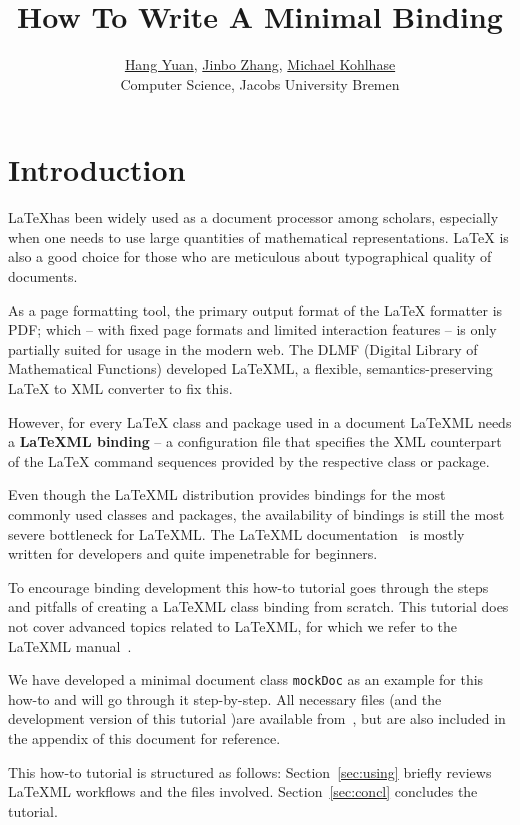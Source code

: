 \documentclass[a4paper]{article}
\title{\textbf{How To Write A Minimal \latexml Binding}}
\author{\href{mailto:h.yuan@jacobs-university.de}{Hang Yuan}, 
	\href{mailto:jin.zhang@jacobs-university.de}{Jinbo Zhang},
        \href{mailto:m.kohlhase@jacobs-university.de}{Michael Kohlhase}\\
        Computer Science, Jacobs University Bremen}
\def\latexml{{\LaTeX}ML\xspace}
\begin{document}
\maketitle

\section{Introduction}\label{sec:intro}

{\LaTeX}has been widely used as a document processor among scholars, especially when one
needs to use large quantities of mathematical representations. {\LaTeX} is also a good
choice for those who are meticulous about typographical quality of documents.

As a page formatting tool, the primary output format of the {\LaTeX} formatter is PDF;
which -- with fixed page formats and limited interaction features -- is only partially
suited for usage in the modern web. The DLMF (Digital Library of Mathematical Functions)
developed \latexml, a flexible, semantics-preserving {\LaTeX} to XML converter to fix
this.

However, for every {\LaTeX} class and package used in a document \latexml needs a
\textbf{\latexml binding} -- a configuration file that specifies the XML counterpart of
the {\LaTeX} command sequences provided by the respective class or package. 

Even though the \latexml distribution provides bindings for the most commonly used classes
and packages, the availability of bindings is still the most severe bottleneck for
\latexml. The \latexml documentation~\cite{LaTeXML:manual} is mostly written for developers and
quite impenetrable for beginners.

To encourage binding development this how-to tutorial goes through the steps and pitfalls
of creating a \latexml class binding from scratch. This tutorial does not cover advanced
topics related to \latexml, for which we refer to the \latexml manual~\cite{LaTeXML:manual}.

We have developed a minimal document class \lstinline|mockDoc| as an example for this
how-to and will go through it step-by-step. All necessary files (and the development
version of this tutorial )are available from~\cite{mockDoc:git}, but are also included in
the appendix of this document for reference.

This how-to tutorial is structured as follows: Section~\ref{sec:using} briefly reviews
\latexml workflows and the files involved. Section~\ref{sec:concl} concludes the tutorial.
\end{document}
